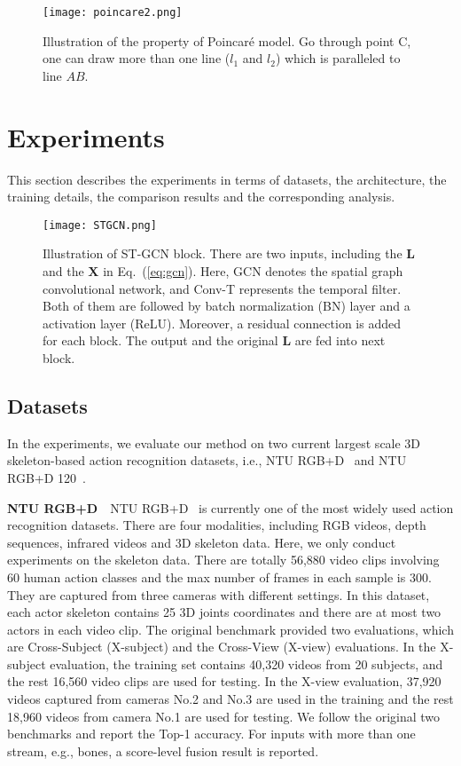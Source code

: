 \documentclass[letterpaper]{article} \usepackage{aaai19}  \usepackage{times}  \usepackage{helvet} \usepackage{courier}  \usepackage[hyphens]{url}  \usepackage{graphicx} \urlstyle{rm} \def\UrlFont{\rm}  \usepackage{graphicx}  \frenchspacing  \setlength{\pdfpagewidth}{8.5in}  \setlength{\pdfpageheight}{11in}
\begin{document}
\begin{figure}
    \centering
    \texttt{[image: poincare2.png]}
    \caption{Illustration of the property of Poincar\'e model. Go through point C, one can draw more than one line ($l_1$ and $l_2$) which is paralleled to line $AB$.}
    \label{fig:poincare2}
    \vspace{-2em}
\end{figure}


\section{Experiments}\label{sec:exp}
This section describes the experiments in terms of datasets, the architecture, the training details, the comparison results and the corresponding analysis.

\begin{figure}
    \centering
    \texttt{[image: STGCN.png]}
    \caption{ Illustration of ST-GCN block. There are two inputs, including the $\textbf{L}$ and the $\textbf{X}$ in Eq.~(\ref{eq:gcn}). Here, GCN denotes the spatial graph convolutional network, and Conv-T represents the temporal filter. Both of them are followed by batch normalization (BN) layer and a activation layer (ReLU). Moreover, a residual connection is added for each block. The output and the original $\textbf{L}$ are fed into next block.}
    \label{fig:stgcn}
\end{figure}
\subsection{Datasets}
In the experiments, we evaluate our method on two current largest scale 3D skeleton-based action recognition datasets, i.e., NTU RGB+D~\cite{shahroudy2016ntu} and NTU RGB+D 120~\cite{liu2019ntu}.

\textbf{NTU RGB+D}~~NTU RGB+D~\cite{shahroudy2016ntu} is currently one of the most widely used action recognition datasets. There are four modalities, including RGB videos, depth sequences, infrared videos and 3D skeleton data. Here, we only conduct experiments on the skeleton data. There are totally 56,880 video clips involving 60 human action classes and the max number of frames in each sample is 300. They are captured from three cameras with different settings. In this dataset, each actor skeleton contains 25 3D joints coordinates and there are at most two actors in each video clip. The original benchmark provided two evaluations, which are Cross-Subject (X-subject) and the Cross-View (X-view) evaluations. In the X-subject evaluation, the training set contains 40,320 videos from 20 subjects, and the rest 16,560 video clips are used for testing. In the X-view evaluation, 37,920 videos captured from cameras No.2 and No.3 are used in the training and the rest 18,960 videos from camera No.1 are used for testing. We follow the original two benchmarks and report the Top-1 accuracy. For inputs with more than one stream, e.g., bones, a score-level fusion result is reported.
\end{document}
